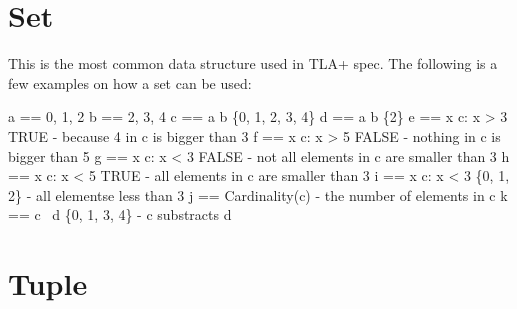 \documentclass{report}
\begin{document}
\section{Set}

This is the most common data structure used in TLA+ spec. The following is a few examples on
how a set can be used:\newline
\begin{tla}
a == {0, 1, 2}
b == {2, 3, 4}
c == a \union b         \* \{0, 1, 2, 3, 4\}
d == a \intersect b     \* \{2\}
e == \E x \in c: x > 3  \* TRUE - because 4 in c is bigger than 3
f == \E x \in c: x > 5  \* FALSE - nothing in c is bigger than 5
g == \A x \in c: x < 3  \* FALSE - not all elements in c are smaller than 3
h == \A x \in c: x < 5  \* TRUE - all elements in c are smaller than 3
i == {x \in c: x < 3}   \* \{0, 1, 2\} - all elementse less than 3
j == Cardinality(c)      - the number of elements in c
k == c \ d              \* \{0, 1, 3, 4\} - c substracts d
\end{tla}
\begin{tlatex}
%
%
%
%
\@xx{}%
%
%
\@xx{}%
%
%
\@xx{}%
%
%
\@xx{}%
%
%
\@xx{}%
%
%
\@xx{}%
%
%
\@xx{}%
%
%
\@xx{}%
%
%
\@xx{}%
\end{tlatex}

\section{Tuple}
\end{document}
